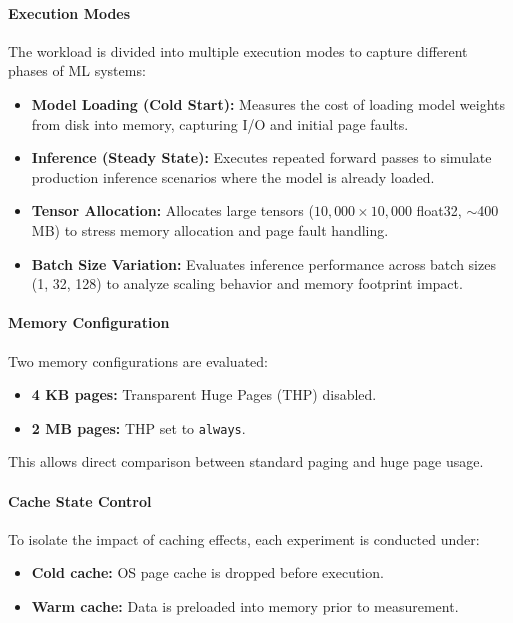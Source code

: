 \documentclass[conference]{IEEEtran}
\begin{document}
\paragraph{Execution Modes}
The workload is divided into multiple execution modes to capture different 
phases of ML systems:

\begin{itemize}
    \item \textbf{Model Loading (Cold Start):} Measures the cost of loading 
    model weights from disk into memory, capturing I/O and initial page faults.

    \item \textbf{Inference (Steady State):} Executes repeated forward passes 
    to simulate production inference scenarios where the model is already loaded.

    \item \textbf{Tensor Allocation:} Allocates large tensors 
    ($10{,}000 \times 10{,}000$ float32, $\sim$400 MB) to stress memory allocation 
    and page fault handling.

    \item \textbf{Batch Size Variation:} Evaluates inference performance across 
    batch sizes (1, 32, 128) to analyze scaling behavior and memory footprint impact.
\end{itemize}

\paragraph{Memory Configuration}
Two memory configurations are evaluated:
\begin{itemize}
    \item \textbf{4 KB pages:} Transparent Huge Pages (THP) disabled.
    \item \textbf{2 MB pages:} THP set to \texttt{always}.
\end{itemize}

This allows direct comparison between standard paging and huge page usage.

\paragraph{Cache State Control}
To isolate the impact of caching effects, each experiment is conducted under:
\begin{itemize}
    \item \textbf{Cold cache:} OS page cache is dropped before execution.
    \item \textbf{Warm cache:} Data is preloaded into memory prior to measurement.
\end{itemize}
\end{document}
